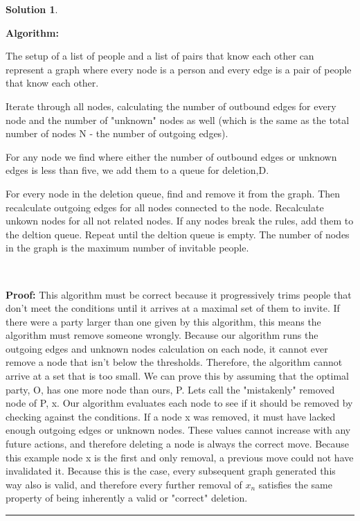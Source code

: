 \documentclass{article}
\theoremstyle{definition}
\def\fline{\rule{0.75\linewidth}{0.5pt}}
\newcommand{\finishline}{\begin{center}\fline\end{center}}
\newtheorem*{solution*}{Solution}
\newenvironment{solution}{\begin{solution*}}{{\finishline} \end{solution*}}
\begin{document}
\begin{solution}

    \

    \textbf{Algorithm: }

    The setup of a list of people and a list of pairs that know each other can represent a graph where every node is a person and every edge is a pair of people that know each other. 

    Iterate through all nodes, calculating the number of outbound edges for every node and the number of "unknown" nodes as well (which is the same as the total number of nodes N - the number of outgoing edges).

    For any node we find where either the number of outbound edges or unknown edges is less than five, we add them to a queue for deletion,D.
    
    For every node in the deletion queue, find and remove it from the graph. Then recalculate outgoing edges for all nodes connected to the node. Recalculate unkown nodes for all not related nodes. If any nodes break the rules, add them to the deltion queue. Repeat until the deltion queue is empty. The number of nodes in the graph is the maximum number of invitable people.

    \

    \textbf{Proof: }
    This algorithm must be correct because it progressively trims people that don't meet the conditions until it arrives at a maximal set of them to invite. If there were a party larger than one given by this algorithm, this means the algorithm must remove someone wrongly. Because our algorithm runs the outgoing edges and unknown nodes calculation on each node, it cannot ever remove a node that isn't below the thresholds. Therefore, the algorithm cannot arrive at a set that is too small. We can prove this by assuming that the optimal party, O, has one more node than ours, P. Lets call the "mistakenly" removed node of P, x. Our algorithm evaluates each node to see if it should be removed by checking against the conditions. If a node x was removed, it must have lacked enough outgoing edges or unknown nodes. These values cannot increase with any future actions, and therefore deleting a node is always the correct move. Because this example node x is the first and only removal, a previous move could not have invalidated it. Because this is the case, every subsequent graph generated this way also is valid, and therefore every further removal of $x_n$ satisfies the same property of being inherently a valid or "correct" deletion.




\end{solution}
\end{document}
